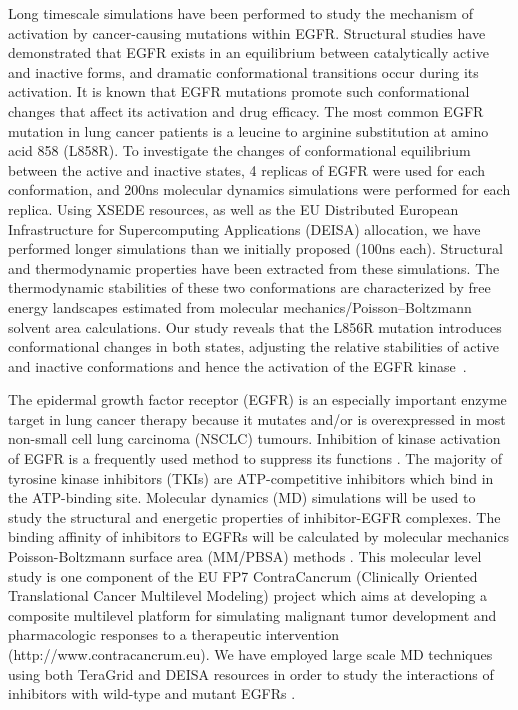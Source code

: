 \documentclass[a4paper,10pt]{article}
\begin{document}
Long timescale simulations have been performed to study the mechanism of activation by 
cancer-causing mutations within EGFR. Structural studies have demonstrated that EGFR exists in an 
equilibrium between catalytically active and inactive forms, and dramatic conformational 
transitions occur during its activation. It is known that EGFR mutations promote such conformational 
changes that affect its activation and drug efficacy. The most common EGFR mutation in lung cancer 
patients is a leucine to arginine substitution at amino acid 858 (L858R). To investigate the changes 
of conformational equilibrium between the active and inactive states, 4 replicas of EGFR were used 
for each conformation, and 200ns molecular dynamics simulations were performed for each replica. 
Using XSEDE resources, as well as the EU Distributed European Infrastructure for Supercomputing 
Applications (DEISA) allocation, we have performed longer simulations than we initially proposed 
(100ns each). Structural and thermodynamic properties have been extracted from these simulations. 
The thermodynamic stabilities of these two conformations are characterized by free energy landscapes 
estimated from molecular mechanics/Poisson–Boltzmann solvent area calculations. Our study reveals 
that the L856R mutation introduces conformational changes in both states, adjusting the relative 
stabilities of active and inactive conformations and hence the activation of the EGFR kinase~\cite{Ref7}.

The epidermal growth factor receptor (EGFR) is an especially important enzyme target in lung cancer therapy because it mutates and/or is overexpressed in most non-small cell lung carcinoma (NSCLC) tumours. Inhibition of kinase activation of EGFR is a frequently used method to suppress its functions \cite{bib:nature_tki}. The majority of tyrosine kinase inhibitors (TKIs) are ATP-competitive inhibitors which bind in the ATP-binding site. Molecular dynamics (MD) simulations will be used to study the structural and energetic properties of inhibitor-EGFR complexes. The binding affinity of inhibitors to EGFRs will be calculated by molecular mechanics Poisson-Boltzmann surface area (MM/PBSA) methods \cite{bib:wan_philtrans}. This molecular level study is one component of the EU FP7 ContraCancrum (Clinically Oriented Translational Cancer Multilevel Modeling) project which aims at developing a composite multilevel platform for simulating malignant tumor development and pharmacologic responses to a therapeutic intervention (http://www.contracancrum.eu). We have employed large scale MD techniques using both TeraGrid and DEISA resources in order to study the interactions of inhibitors with wild-type and mutant EGFRs \cite{bib:wc2009}.
\end{document}
